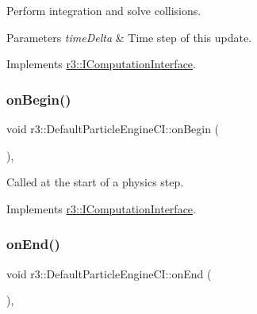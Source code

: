 Perform integration and solve collisions. 


\begin{DoxyParams}{Parameters}
{\em time\+Delta} & Time step of this update. \\
\hline
\end{DoxyParams}


Implements \mbox{\hyperlink{classr3_1_1_i_computation_interface_a162250f2b6efbd85460bd0f780d42cff}{r3\+::\+I\+Computation\+Interface}}.

\mbox{\label{classr3_1_1_default_particle_engine_c_i_aaf2e9ca87bff5e48c8eb59384e9cf180}} 
\subsubsection{\texorpdfstring{on\+Begin()}{onBegin()}}
{\footnotesize\ttfamily void r3\+::\+Default\+Particle\+Engine\+C\+I\+::on\+Begin (\begin{DoxyParamCaption}{ }\end{DoxyParamCaption})\hspace{0.3cm}{\ttfamily [override]}, {\ttfamily [virtual]}}



Called at the start of a physics step. 



Implements \mbox{\hyperlink{classr3_1_1_i_computation_interface_a430ebc9cb8d4ba064ac6a032ef07edd7}{r3\+::\+I\+Computation\+Interface}}.

\mbox{\label{classr3_1_1_default_particle_engine_c_i_a6a34c77436d8133560eaa7366c740119}} 
\subsubsection{\texorpdfstring{on\+End()}{onEnd()}}
{\footnotesize\ttfamily void r3\+::\+Default\+Particle\+Engine\+C\+I\+::on\+End (\begin{DoxyParamCaption}{ }\end{DoxyParamCaption})\hspace{0.3cm}{\ttfamily [override]}, {\ttfamily [virtual]}}



